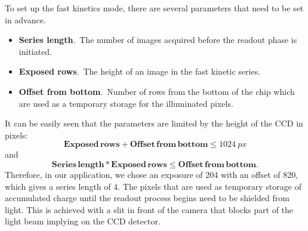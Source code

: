 
To set up the fast kinetics mode, there are several parameters that need to be set in advance.
\begin{itemize}
	\item \textbf{Series length}.\, The number of images acquired before the readout phase is initiated.
	\item \textbf{Exposed rows}.\, The height of an image in the fast kinetic series.
	\item \textbf{Offset from bottom}.\, Number of rows from the bottom of the chip which are used as a temporary storage for the illuminated pixels.
\end{itemize}

It can be easily seen that the parameters are limited by the height of the CCD in pixels:
\begin{equation}
\mathbf{Exposed\,rows} + \mathbf{Offset\,from\,bottom} \leq \SI{1024}{px}
\end{equation}
and
\begin{equation}
\mathbf{Series\,length}*\mathbf{Exposed\,rows} \leq \mathbf{Offset\,from\,bottom}.
\end{equation}
Therefore, in our application, we chose an exposure of \SI{204}{\px} with an offset of \SI{820}{\px}, which gives a series length of $4$.
The pixels that are used as temporary storage of accumulated charge until the readout process begins need to be shielded from light. This is achieved with a slit in front of the camera that blocks part of the light beam implying on the CCD detector.

